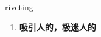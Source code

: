 
\begin{frame}
{\huge riveting}
\begin{center}
\begin{enumerate}\Large
  \item \textbf{吸引人的，极迷人的}
\end{enumerate}
\end{center}
\end{frame}
